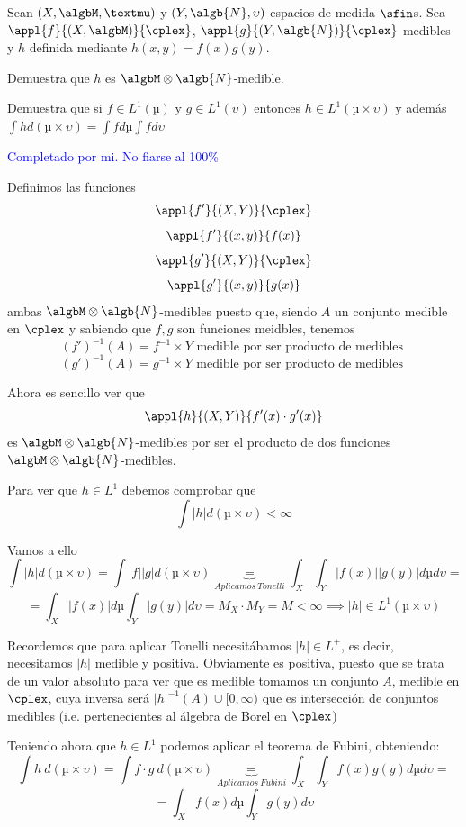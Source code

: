 \begin{problem}[3]
Sean $(X, \algbM, µ)$ y $(Y, \algb{N}, \upsilon)$ espacios de medida $\sfin$s. Sea $\appl{f}{(X, \algbM)}{\cplex}$, $\appl{g}{(Y, \algb{N})}{\cplex}$ medibles y $h$ definida mediante $h(x,y)=f(x)g(y)$.

\ppart
Demuestra que $h$ es $\algbM\otimes\algb{N}$-medible.

\ppart
Demuestra que si $f\in L^1(µ)$ y $g \in L^1(\upsilon)$ entonces $h\in L^1(µ \times \upsilon)$ y además $\int hd(µ\times\upsilon)=\int f dµ \int f d\upsilon$

\solution

\textcolor{blue}{Completado por mi. No fiarse al 100\%}

\spart
Definimos las funciones
\[\appl{f'}{(X,Y)}{\cplex}\]
\[\appl{f'}{(x,y)}{f(x)}\]
\[\appl{g'}{(X,Y)}{\cplex}\]
\[\appl{g'}{(x,y)}{g(x)}\]
ambas $\algbM\otimes\algb{N}$-medibles puesto que, siendo $A$ un conjunto medible en $\cplex$ y sabiendo que $f,g$ son funciones meidbles, tenemos
\[(f')^{-1}(A)=f^{-1}\times Y \text{ medible por ser producto de medibles }\]
\[(g')^{-1}(A)=g^{-1}\times Y \text{ medible por ser producto de medibles }\]

Ahora es sencillo ver que
\[\appl{h}{(X,Y)}{f'(x)\cdot g'(x)}\]
es $\algbM\otimes\algb{N}$-medibles por ser el producto de dos funciones $\algbM\otimes\algb{N}$-medibles.


\spart

Para ver que $h\in L^1$ debemos comprobar que
\[\int |h|d(µ\times\upsilon) < \infty\]

Vamos a ello
\[\int |h|d(µ\times\upsilon) = \int |f||g|d(µ\times \upsilon) \underbrace{=}_{Aplicamos \ Tonelli} \int_X\int_Y |f(x)||g(y)| dµ d\upsilon =\]
\[= \int_X |f(x)| dµ \int_Y |g(y)| d \upsilon = M_X \cdot M_Y = M < \infty \implies |h| \in L^1(µ\times \upsilon)\]

Recordemos que para aplicar Tonelli necesitábamos $|h|\in L^+$, es decir, necesitamos $|h|$ medible y positiva. Obviamente es positiva, puesto que se trata de un valor absoluto para ver que es medible tomamos un conjunto $A$, medible en $\cplex$, cuya inversa será $|h|^{-1}(A)\cup[0,\infty)$ que es intersección de conjuntos medibles (i.e. pertenecientes al álgebra de Borel en $\cplex$)

Teniendo ahora que $h\in L^1$ podemos aplicar el teorema de Fubini, obteniendo:
\[\int h \ d(µ\times\upsilon) = \int f\cdot g \ d(µ\times \upsilon) \underbrace{=}_{Aplicamos \ Fubini} \int_X\int_Y f(x)g(y) dµ d\upsilon =\]
\[= \int_X f(x) dµ \int_Y g(y) d \upsilon \]
\end{problem}

